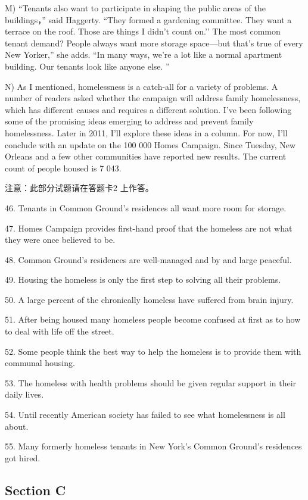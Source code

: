 \documentclass[UTF8,11pt]{ctexart}
\begin{document}
M) “Tenants also want to participate in shaping the public areas of the buildings，” said Haggerty. “They formed a gardening committee. They want a terrace on the roof. Those are things I didn’t count on.’’ The most common tenant demand? People always want more storage space—but that’s true of every New Yorker,” she adds. “In many ways, we’re a lot like a normal apartment building. Our tenants look like anyone else. ”


N) As I mentioned, homelessness is a catch-all for a variety of problems. A number of readers asked whether the campaign will address family homelessness, which has different causes and requires a different solution. I’ve been following some of the promising ideas emerging to address and prevent family homelessness. Later in 2011, I’ll explore these ideas in a column. For now, I’ll conclude with an update on the 100 000 Homes Campaign. Since Tuesday, New Orleans and a few other communities have reported new results. The current count of people housed is 7 043.


注意：此部分试题请在答题卡2 上作答。


46. Tenants in Common Ground’s residences all want more room for storage.


47. Homes Campaign provides first-hand proof that the homeless are not what they were once believed to be.


48. Common Ground’s residences are well-managed and by and large peaceful.


49. Housing the homeless is only the first step to solving all their problems.


50. A large percent of the chronically homeless have suffered from brain injury.


51. After being housed many homeless people become confused at first as to how to deal with life off the street.


52. Some people think the best way to help the homeless is to provide them with communal housing.


53. The homeless with health problems should be given regular support in their daily lives.


54. Until recently American society has failed to see what homelessness is all about.


55. Many formerly homeless tenants in New York’s Common Ground’s residences got hired.


\subsection*{\textbf{Section C}}
\end{document}
